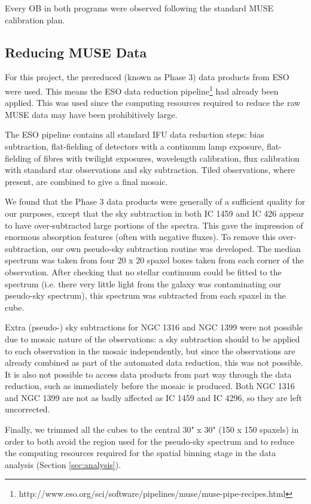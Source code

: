 		Every OB in both programs were observed following the standard MUSE calibration plan.

	\subsection{Reducing MUSE Data}
		For this project, the prereduced (known as Phase 3) data products from ESO were used. This means the ESO data reduction pipeline\footnote{http://www.eso.org/sci/software/pipelines/muse/muse-pipe-recipes.html} had already been applied. This was used since the computing resources required to reduce the raw MUSE data may have been prohibitively large.

		The ESO pipeline contains all standard IFU data reduction steps: bias subtraction, flat-fielding of detectors with a continuum lamp exposure, flat-fielding of fibres with twilight exposures, wavelength calibration, flux calibration with standard star observations and sky subtraction. Tiled observations, where present, are combined to give a final mosaic.

		We found that the Phase 3 data products were generally of a sufficient quality for our purposes, except that the sky subtraction in both IC 1459 and IC 426 appear to have over-subtracted large portions of the spectra. This gave the impression of enormous absorption features (often with negative fluxes). To remove this over-subtraction, our own pseudo-sky subtraction routine was developed. The median spectrum was taken from four 20 x 20 spaxel boxes taken from each corner of the observation. After checking that no stellar continuum could be fitted to the spectrum (i.e. there very little light from the galaxy was contaminating our pseudo-sky spectrum), this spectrum was subtracted from each spaxel in the cube. 

		Extra (pseudo-) sky subtractions for NGC 1316 and NGC 1399 were not possible due to mosaic nature of the observations: a sky subtraction should to be applied to each observation in the mosaic independently, but since the observations are already combined as part of the automated data reduction, this was not possible. It is also not possible to access data products from part way through the data reduction, such as immediately before the mosaic is produced. Both NGC 1316 and NGC 1399 are not as badly affected as IC 1459 and IC 4296, so they are left uncorrected. 

		Finally, we trimmed all the cubes to the central 30" x 30" (150 x 150 spaxels) in order to both avoid the region used for the pseudo-sky spectrum and to reduce the computing resources required for the spatial binning stage in the data analysis (Section \ref{sec:analysis}). 

